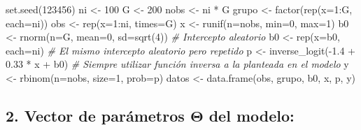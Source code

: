 \documentclass[
]{article}
\newenvironment{Shaded}{\begin{snugshade}}{\end{snugshade}}
\newcommand{\AttributeTok}[1]{\textcolor[rgb]{0.77,0.63,0.00}{#1}}
\newcommand{\CommentTok}[1]{\textcolor[rgb]{0.56,0.35,0.01}{\textit{#1}}}
\newcommand{\DecValTok}[1]{\textcolor[rgb]{0.00,0.00,0.81}{#1}}
\newcommand{\FloatTok}[1]{\textcolor[rgb]{0.00,0.00,0.81}{#1}}
\newcommand{\FunctionTok}[1]{\textcolor[rgb]{0.00,0.00,0.00}{#1}}
\newcommand{\NormalTok}[1]{#1}
\newcommand{\OtherTok}[1]{\textcolor[rgb]{0.56,0.35,0.01}{#1}}
\newcommand{\SpecialCharTok}[1]{\textcolor[rgb]{0.00,0.00,0.00}{#1}}
\begin{document}
\begin{Shaded}
\begin{Highlighting}[]
\FunctionTok{set.seed}\NormalTok{(}\DecValTok{123456}\NormalTok{)}
\NormalTok{ni }\OtherTok{\textless{}{-}} \DecValTok{100}
\NormalTok{G }\OtherTok{\textless{}{-}} \DecValTok{200}
\NormalTok{nobs }\OtherTok{\textless{}{-}}\NormalTok{ ni }\SpecialCharTok{*}\NormalTok{ G}
\NormalTok{grupo }\OtherTok{\textless{}{-}} \FunctionTok{factor}\NormalTok{(}\FunctionTok{rep}\NormalTok{(}\AttributeTok{x=}\DecValTok{1}\SpecialCharTok{:}\NormalTok{G, }\AttributeTok{each=}\NormalTok{ni))}
\NormalTok{obs }\OtherTok{\textless{}{-}} \FunctionTok{rep}\NormalTok{(}\AttributeTok{x=}\DecValTok{1}\SpecialCharTok{:}\NormalTok{ni, }\AttributeTok{times=}\NormalTok{G)}
\NormalTok{x }\OtherTok{\textless{}{-}} \FunctionTok{runif}\NormalTok{(}\AttributeTok{n=}\NormalTok{nobs, }\AttributeTok{min=}\DecValTok{0}\NormalTok{, }\AttributeTok{max=}\DecValTok{1}\NormalTok{)}
\NormalTok{b0 }\OtherTok{\textless{}{-}} \FunctionTok{rnorm}\NormalTok{(}\AttributeTok{n=}\NormalTok{G, }\AttributeTok{mean=}\DecValTok{0}\NormalTok{, }\AttributeTok{sd=}\FunctionTok{sqrt}\NormalTok{(}\DecValTok{4}\NormalTok{)) }\CommentTok{\# Intercepto aleatorio}
\NormalTok{b0 }\OtherTok{\textless{}{-}} \FunctionTok{rep}\NormalTok{(}\AttributeTok{x=}\NormalTok{b0, }\AttributeTok{each=}\NormalTok{ni)             }\CommentTok{\# El mismo intercepto aleatorio pero repetido}
\NormalTok{p }\OtherTok{\textless{}{-}} \FunctionTok{inverse\_logit}\NormalTok{(}\SpecialCharTok{{-}}\FloatTok{1.4} \SpecialCharTok{+} \FloatTok{0.33} \SpecialCharTok{*}\NormalTok{ x }\SpecialCharTok{+}\NormalTok{ b0) }\CommentTok{\# Siempre utilizar función inversa a la planteada en el modelo}
\NormalTok{y }\OtherTok{\textless{}{-}} \FunctionTok{rbinom}\NormalTok{(}\AttributeTok{n=}\NormalTok{nobs, }\AttributeTok{size=}\DecValTok{1}\NormalTok{, }\AttributeTok{prob=}\NormalTok{p)}
\NormalTok{datos }\OtherTok{\textless{}{-}} \FunctionTok{data.frame}\NormalTok{(obs, grupo, b0, x, p, y)}
\end{Highlighting}
\end{Shaded}

\hypertarget{vector-de-paruxe1metros-boldsymboltheta-del-modelo}{%
\subsection{\texorpdfstring{2. Vector de parámetros
\(\boldsymbol{\Theta}\) del
modelo:}{2. Vector de parámetros \textbackslash boldsymbol\{\textbackslash Theta\} del modelo:}}\label{vector-de-paruxe1metros-boldsymboltheta-del-modelo}}
\end{document}

